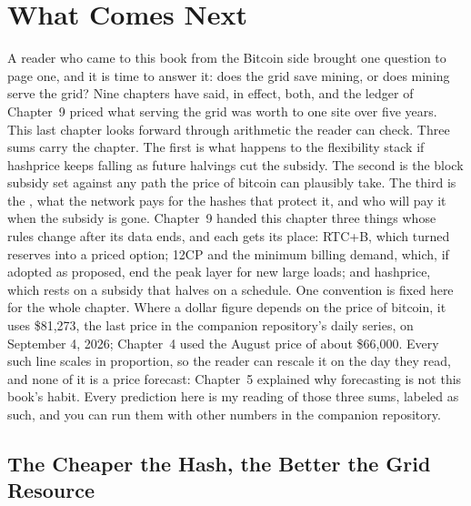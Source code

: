 \chapter{What Comes Next}
\label{ch:outlook}

A reader who came to this book from the Bitcoin side brought one question to page one, and it is time to answer it: does the grid save mining, or does mining serve the grid? Nine chapters have said, in effect, both, and the ledger of Chapter~9 priced what serving the grid was worth to one site over five years. This last chapter looks forward through arithmetic the reader can check. Three sums carry the chapter. The first is what happens to the flexibility stack if hashprice keeps falling as future halvings cut the subsidy. The second is the block subsidy set against any path the price of bitcoin can plausibly take. The third is the , what the network pays for the hashes that protect it, and who will pay it when the subsidy is gone. Chapter~9 handed this chapter three things whose rules change after its data ends, and each gets its place: RTC+B, which turned reserves into a priced option; 12CP and the minimum billing demand, which, if adopted as proposed, end the peak layer for new large loads; and hashprice, which rests on a subsidy that halves on a schedule. One convention is fixed here for the whole chapter. Where a dollar figure depends on the price of bitcoin, it uses \$81,273, the last price in the companion repository's daily series, on September 4, 2026; Chapter~4 used the August price of about \$66,000. Every such line scales in proportion, so the reader can rescale it on the day they read, and none of it is a price forecast: Chapter~5 explained why forecasting is not this book's habit. Every prediction here is my reading of those three sums, labeled as such, and you can run them with other numbers in the companion repository. %

\section{The Cheaper the Hash, the Better the Grid Resource}
\label{sec:outlook-cheaper}

